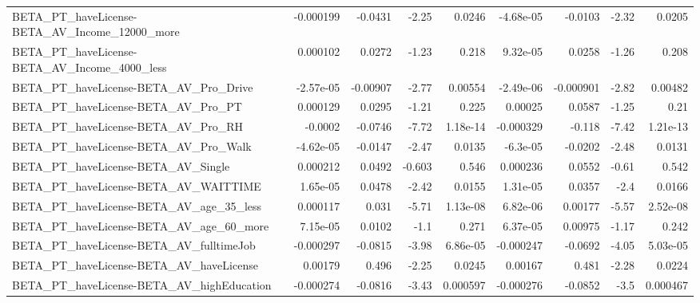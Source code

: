 \begin{tabular}{lrrrrrrrr}
BETA\_PT\_haveLicense-BETA\_AV\_Income\_12000\_more      &   -0.000199 &      -0.0431 &     -2.25 &   0.0246 &  -4.68e-05 &     -0.0103 &        -2.32 &        0.0205 \\
BETA\_PT\_haveLicense-BETA\_AV\_Income\_4000\_less       &    0.000102 &       0.0272 &     -1.23 &    0.218 &   9.32e-05 &      0.0258 &        -1.26 &         0.208 \\
BETA\_PT\_haveLicense-BETA\_AV\_Pro\_Drive              &   -2.57e-05 &     -0.00907 &     -2.77 &  0.00554 &  -2.49e-06 &   -0.000901 &        -2.82 &       0.00482 \\
BETA\_PT\_haveLicense-BETA\_AV\_Pro\_PT                 &    0.000129 &       0.0295 &     -1.21 &    0.225 &    0.00025 &      0.0587 &        -1.25 &          0.21 \\
BETA\_PT\_haveLicense-BETA\_AV\_Pro\_RH                 &     -0.0002 &      -0.0746 &     -7.72 & 1.18e-14 &  -0.000329 &      -0.118 &        -7.42 &      1.21e-13 \\
BETA\_PT\_haveLicense-BETA\_AV\_Pro\_Walk               &   -4.62e-05 &      -0.0147 &     -2.47 &   0.0135 &   -6.3e-05 &     -0.0202 &        -2.48 &        0.0131 \\
BETA\_PT\_haveLicense-BETA\_AV\_Single                 &    0.000212 &       0.0492 &    -0.603 &    0.546 &   0.000236 &      0.0552 &        -0.61 &         0.542 \\
BETA\_PT\_haveLicense-BETA\_AV\_WAITTIME               &    1.65e-05 &       0.0478 &     -2.42 &   0.0155 &   1.31e-05 &      0.0357 &         -2.4 &        0.0166 \\
BETA\_PT\_haveLicense-BETA\_AV\_age\_35\_less            &    0.000117 &        0.031 &     -5.71 & 1.13e-08 &   6.82e-06 &     0.00177 &        -5.57 &      2.52e-08 \\
BETA\_PT\_haveLicense-BETA\_AV\_age\_60\_more            &    7.15e-05 &       0.0102 &      -1.1 &    0.271 &   6.37e-05 &     0.00975 &        -1.17 &         0.242 \\
BETA\_PT\_haveLicense-BETA\_AV\_fulltimeJob            &   -0.000297 &      -0.0815 &     -3.98 & 6.86e-05 &  -0.000247 &     -0.0692 &        -4.05 &      5.03e-05 \\
BETA\_PT\_haveLicense-BETA\_AV\_haveLicense            &     0.00179 &        0.496 &     -2.25 &   0.0245 &    0.00167 &       0.481 &        -2.28 &        0.0224 \\
BETA\_PT\_haveLicense-BETA\_AV\_highEducation          &   -0.000274 &      -0.0816 &     -3.43 & 0.000597 &  -0.000276 &     -0.0852 &         -3.5 &      0.000467 \\

\end{tabular}
